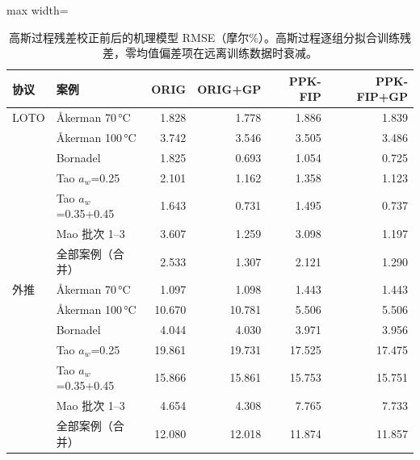 \begin{table}[t]
\centering
\caption{高斯过程残差校正前后的机理模型 RMSE（摩尔\%）。高斯过程逐组分拟合训练残差，零均值偏差项在远离训练数据时衰减。}\label{tab:hybrid}
\footnotesize
\begin{adjustbox}{max width=\linewidth}
\begin{tabular}{llrrrr}
\toprule
协议 & 案例 & ORIG & ORIG+GP & PPK-FIP & PPK-FIP+GP \\
\midrule
LOTO & Åkerman 70\,°C & 1.828 & 1.778 & 1.886 & 1.839 \\
 & Åkerman 100\,°C & 3.742 & 3.546 & 3.505 & 3.486 \\
 & Bornadel & 1.825 & 0.693 & 1.054 & 0.725 \\
 & Tao $a_w$=0.25 & 2.101 & 1.162 & 1.358 & 1.123 \\
 & Tao $a_w$=0.35+0.45 & 1.643 & 0.731 & 1.495 & 0.737 \\
 & Mao 批次 1--3 & 3.607 & 1.259 & 3.098 & 1.197 \\
 & 全部案例（合并） & 2.533 & 1.307 & 2.121 & 1.290 \\
\midrule
外推 & Åkerman 70\,°C & 1.097 & 1.098 & 1.443 & 1.443 \\
 & Åkerman 100\,°C & 10.670 & 10.781 & 5.506 & 5.506 \\
 & Bornadel & 4.044 & 4.030 & 3.971 & 3.956 \\
 & Tao $a_w$=0.25 & 19.861 & 19.731 & 17.525 & 17.475 \\
 & Tao $a_w$=0.35+0.45 & 15.866 & 15.861 & 15.753 & 15.751 \\
 & Mao 批次 1--3 & 4.654 & 4.308 & 7.765 & 7.733 \\
 & 全部案例（合并） & 12.080 & 12.018 & 11.874 & 11.857 \\
\bottomrule
\end{tabular}
\end{adjustbox}
\end{table}
